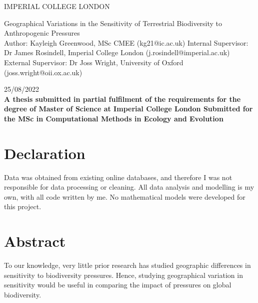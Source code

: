 \documentclass[11pt, a4paper, titlepage]{article}
\begin{document}
    \begin{titlepage}
    \begin{center}
            {\large IMPERIAL COLLEGE LONDON}
    \end{center}
    
    \vspace*{\fill}
    
    \begin{center}
        {\Huge 
    	 Geographical Variations in the Sensitivity of Terrestrial Biodiversity to Anthropogenic Pressures}
        \\[2in]
        Author: Kayleigh Greenwood, MSc CMEE (kg21@ic.ac.uk)
        \bigskip
        \newline
       Internal Supervisor: Dr James Rosindell, Imperial College London (j.rosindell@imperial.ac.uk)
       \bigskip
       \newline
        External Supervisor: Dr Joss Wright, University of Oxford (joss.wright@oii.ox.ac.uk)
        \bigskip
        \newline

        25/08/2022
        \\[2in]
        
        {\bfseries A thesis submitted in partial fulfilment of the requirements for the degree of Master of Science at Imperial College London \newline \newline Submitted for the MSc in Computational Methods in Ecology and Evolution }

        

    
	\end{center}
    \vspace{\fill}
    
    \end{titlepage}
	\section*{Declaration}

	Data was obtained from existing online databases, and therefore I was not responsible for data processing or cleaning. All data analysis and modelling is my own, with all code written by me. No mathematical models were developed for this project.

	\newpage
	
	\section*{Abstract}
	 To our knowledge, very little prior research has studied geographic differences in sensitivity to biodiversity pressures. Hence, studying geographical variation in  sensitivity would be useful in comparing the impact of pressures on global biodiversity.
	
\end{document}
